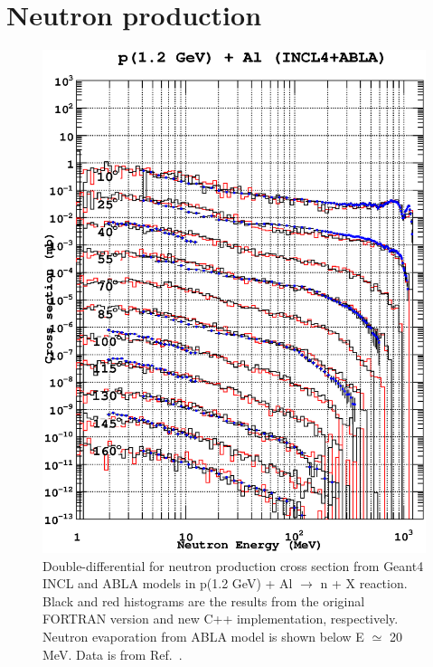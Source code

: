 \documentclass[a4paper]{jpconf}
\begin{document}
\section{Neutron production}

\begin{figure}
\begin{center}
\includegraphics[scale=0.70]{poster/images/aluminum.eps}
\caption{Double-differential for neutron production cross section
    from Geant4 INCL and ABLA models in p(1.2 GeV) + Al $\rightarrow$ n + X reaction.
Black and red histograms are the
    results from the original FORTRAN version and new C++ implementation, respectively. 
Neutron evaporation from ABLA model is shown below E $\simeq$ 20 MeV.
Data is from Ref.~\cite{data}.}
\label{fig:neutronAl}
\end{center}
\end{figure}
\end{document}
